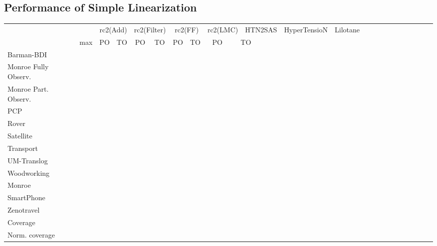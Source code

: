 \documentclass[letterpaper]{article} %
\begin{document}
\subsection{Performance of Simple Linearization}

\begin{table}[h]
	\scalebox{0.45} {
		\begin{tabular}{lccccccccccccccccccccccccl} 
			\toprule 
			&& \multicolumn{2}{c}{rc2(Add)} & \multicolumn{2}{c}{rc2(Filter)} & \multicolumn{2}{c}{rc2(FF)} & \multicolumn{2}{c}{rc2(LMC)}  & \multicolumn{2}{c}{HTN2SAS} & \multicolumn{2}{c}{HyperTensioN} & \multicolumn{2}{c}{Lilotane} \\ 
			\cmidrule(lr){3-4} \cmidrule(lr){5-6} \cmidrule(lr){7-8} \cmidrule(lr){9-10} \cmidrule(lr){11-12}  \cmidrule(lr){13-14} \cmidrule(lr){15-16}    
			& max &PO & TO & PO & TO & PO & TO & PO &\multicolumn{2}{c}{ TO  }   \\ 
			\midrule 
			Barman-BDI  \\ 
			Monroe Fully Observ. \\ 
			Monroe Part. Observ. \\ 
			PCP\\ 
			Rover  \\ 
			Satellite  \\ 
			Transport \\ 
			UM-Translog \\ 
			Woodworking \\ 
			\midrule 
			Monroe  \\ 
			SmartPhone \\ 
			Zenotravel \\ 
			\midrule 
			Coverage \\ 
			Norm. coverage  \\ 
			\bottomrule
		\end{tabular} 	
	}
\end{table}
\end{document}

